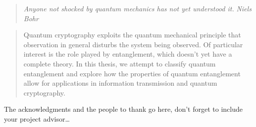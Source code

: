 \documentclass[
11pt,
english, %
doublespacing,
liststotoc, %
headsepline, %
]{MastersDoctoralThesis} %
\begin{document}

\vspace*{0.2\textheight}

\begin{quote}
\textit{Anyone not shocked by quantum mechanics has not yet understood it.}
\bigbreak
\hfill \textit{Niels Bohr}
\end{quote}


\begin{abstract}
\addchaptertocentry{\abstractname} %
Quantum cryptography exploits the quantum mechanical principle that observation in general disturbs the system being observed. Of particular interest is the role played by entanglement, which doesn't yet have a complete theory. In this thesis, we attempt to classify quantum entanglement and explore how the properties of quantum entanglement allow for applications in information transmission and quantum cryptography.
\end{abstract}


\begin{acknowledgements}
\addchaptertocentry{\acknowledgementname} %
The acknowledgments and the people to thank go here, don't forget to include your project advisor\ldots
\end{acknowledgements}


\tableofcontents %


\end{document}
